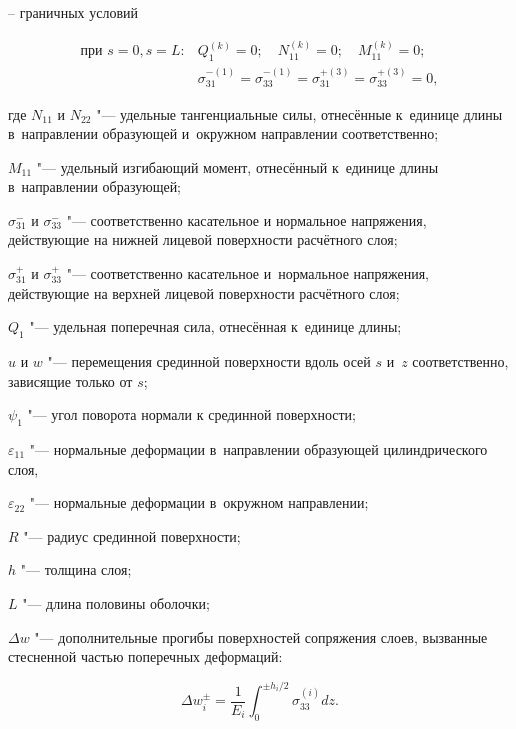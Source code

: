 -- граничных условий

\begin{equation*}

%

\begin{array}{lc}

\text{при } s=0, s=L: & Q_1^{(k)} =0;\quad  N_{11}^{(k)} =0; \quad M_{11}^{(k)} =0;\\

&\sigma _{31}^{-(1)} =\sigma _{33}^{-(1)} =\sigma _{31}^{+(3)} =\sigma _{33}^{+(3)} =0,

\end{array}

\end{equation*}

где $N_{11}$ и $N_{22}$ "--- удельные тангенциальные силы, отнесённые к~единице длины в~направлении образующей и~окружном направлении соответственно; 

$M_{11}$ "--- удельный изгибающий момент, отнесённый к~единице длины в~направлении образующей; 

$\sigma _{31}^{-} $ и $\sigma _{33}^{-} $ "--- соответственно касательное и нормальное напряжения, действующие на нижней лицевой поверхности расчётного слоя; 

$\sigma _{31}^{+} $ и $\sigma _{33}^{+} $ "--- соответственно касательное и~нормальное напряжения, действующие на верхней лицевой поверхности расчётного слоя;

$Q_{1}$ "--- удельная поперечная сила, отнесённая к~единице длины; 

$u$ и $w$ "--- перемещения срединной поверхности вдоль осей $s$ и~$z$ соответственно, зависящие только от $s$; 

$\psi_{1}$ "--- угол поворота нормали к срединной поверхности;

$\varepsilon_{11}$ "--- нормальные деформации в~направлении образующей цилиндрического слоя, 

$\varepsilon_{22}$ "--- нормальные деформации в~окружном направлении; 

$R$ "--- радиус срединной поверхности;

$h$ "--- толщина слоя;

$L$ "--- длина половины оболочки;

$\Delta w$ "--- дополнительные прогибы поверхностей сопряжения слоев, вызванные стесненной частью поперечных деформаций:

\[

\Delta w_i^{\pm} =\frac{1}{E_i}

\int_0^{\pm h_i/2} \sigma_{33}^{(i)} dz.

\]



